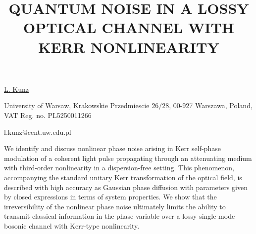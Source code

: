 \title{QUANTUM NOISE IN A LOSSY OPTICAL CHANNEL WITH KERR NONLINEARITY}

\underline{L. Kunz}  

{\normalsize{\vspace{-4mm}
University of Warsaw,
Krakowskie Przedmiescie 26/28,
00-927 Warszawa, Poland,
VAT Reg. no. PL5250011266



\email l.kunz@cent.uw.edu.pl}}

We identify and discuss nonlinear phase noise arising in Kerr self-phase modulation of a coherent light pulse propagating through an attenuating medium with third-order nonlinearity in a dispersion-free setting. This phenomenon, accompanying the standard unitary Kerr transformation of the optical field, is described with high accuracy as Gaussian phase diffusion with parameters given by closed expressions in terms of system properties. We show that the irreversibility of the nonlinear phase noise ultimately limits the ability to transmit classical information in the phase variable over a lossy single-mode bosonic channel with Kerr-type nonlinearity.

\vspace{\baselineskip}